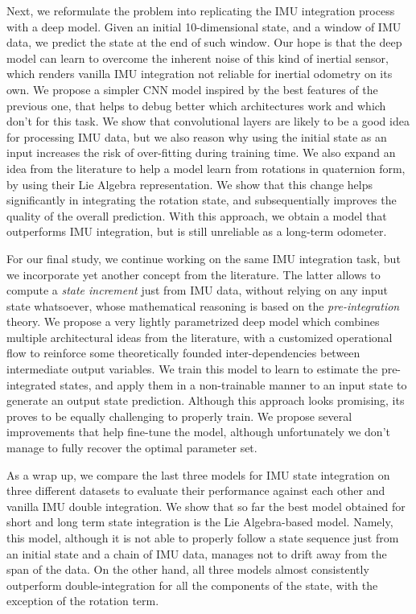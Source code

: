 Next, we reformulate the problem into replicating the IMU integration process with a deep model.
Given an initial 10-dimensional state, and a window of IMU data, we predict the state at the end of such window.
Our hope is that the deep model can learn to overcome the inherent noise of this kind of inertial sensor, which renders vanilla IMU integration not reliable for inertial odometry on its own.
We propose a simpler CNN model inspired by the best features of the previous one, that helps to debug better which architectures work and which don't for this task.
We show that convolutional layers are likely to be a good idea for processing IMU data, but we also reason why using the initial state as an input increases the risk of over-fitting during training time. 
We also expand an idea from the literature to help a model learn from rotations in quaternion form, by using their Lie Algebra representation.
We show that this change helps significantly in integrating the rotation state, and subsequentially improves the quality of the overall prediction.
With this approach, we obtain a model that outperforms IMU integration, but is still unreliable as a long-term odometer.

For our final study, we continue working on the same IMU integration task, but we incorporate yet another concept from the literature.
The latter allows to compute a \emph{state increment} just from IMU data, without relying on any input state whatsoever, whose mathematical reasoning is based on the \emph{pre-integration} theory.
We propose a very lightly parametrized deep model which combines multiple architectural ideas from the literature, with a customized operational flow to reinforce some theoretically founded inter-dependencies between intermediate output variables.
We train this model to learn to estimate the pre-integrated states, and apply them in a non-trainable manner to an input state to generate an output state prediction.
Although this approach looks promising, its proves to be equally challenging to properly train.
We propose several improvements that help fine-tune the model, although unfortunately we don't manage to fully recover the optimal parameter set.

As a wrap up, we compare the last three models for IMU state integration on three different datasets to evaluate their performance against each other and vanilla IMU double integration.
We show that so far the best model obtained for short and long term state integration is the Lie Algebra-based model.
Namely, this model, although it is not able to properly follow a state sequence just from an initial state and a chain of IMU data, manages not to drift away from the span of the data.
On the other hand, all three models almost consistently outperform double-integration for all the components of the state, with the exception of the rotation term.

